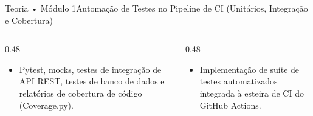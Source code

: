 \begin{senaiframe}{Teoria • Módulo 1}{Automação de Testes no Pipeline de CI (Unitários, Integração e Cobertura)}
  \begin{columns}[t]
    \begin{column}{0.48\textwidth}
      \begin{tcolorbox}[senaibluecard, title={Fundamentos Teóricos}]
        \begin{itemize}
          \item Pytest, mocks, testes de integração de API REST, testes de banco de dados e relatórios de cobertura de código (Coverage.py).
        \end{itemize}
      \end{tcolorbox}
    \end{column}
    \begin{column}{0.48\textwidth}
      \begin{tcolorbox}[senaigreencard, title={Prática \& Laboratório}]
        \begin{itemize}
          \item Implementação de suíte de testes automatizados integrada à esteira de CI do GitHub Actions.
        \end{itemize}
      \end{tcolorbox}
    \end{column}
  \end{columns}
\end{senaiframe}
